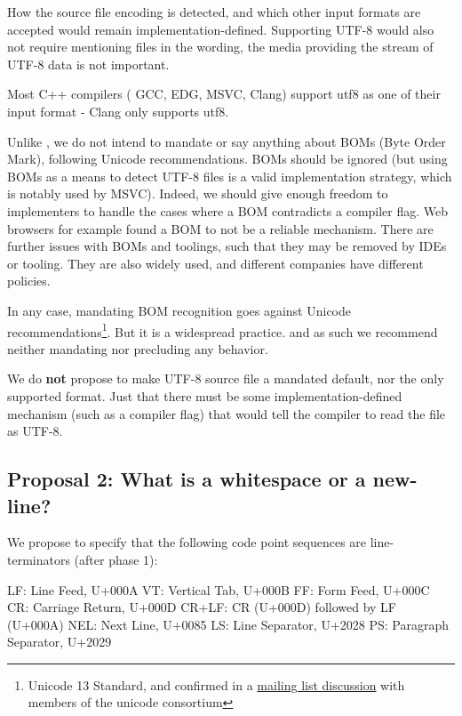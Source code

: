 \documentclass{wg21}
\begin{document}
How the source file encoding is detected, and which other input formats are accepted would remain implementation-defined.
Supporting UTF-8 would also not require mentioning files in the wording, the media providing the stream of UTF-8 data is not important.

Most C++ compilers ( GCC, EDG, MSVC, Clang) support utf8 as one of their input format - Clang only supports utf8.

Unlike , we do not intend to mandate or say anything about BOMs (Byte Order Mark), following Unicode recommendations.
BOMs should be ignored (but using BOMs as a means to detect UTF-8 files is a valid implementation strategy, which is notably used by MSVC).
Indeed, we should give enough freedom to implementers to handle the cases where a BOM contradicts a compiler flag.
Web browsers for example found a BOM to not be a reliable mechanism.
There are further issues with BOMs and toolings, such that they may be removed by IDEs or tooling.
They are also widely used, and different companies have different policies.

In any case, mandating BOM recognition goes against Unicode recommendations\footnote{Unicode 13 Standard, and confirmed in a \href{https://corp.unicode.org/mailman/private/unicode/2020-June/008716.html}{mailing list discussion} with members of the unicode consortium}. But it is a widespread practice. and as such
we recommend neither mandating nor precluding any behavior.

We do \textbf{not} propose to make UTF-8 source file a mandated default, nor the only supported format. Just that there must be
some implementation-defined mechanism (such as a compiler flag) that would tell the compiler to read the file as UTF-8.


\subsection{Proposal 2: What is a whitespace or a new-line?}

We propose to specify that the following code point sequences are line-terminators (after phase 1):

\begin{codeblock}
LF:    Line Feed, U+000A
VT:    Vertical Tab, U+000B
FF:    Form Feed, U+000C
CR:    Carriage Return, U+000D
CR+LF: CR (U+000D) followed by LF (U+000A)
NEL:   Next Line, U+0085
LS:    Line Separator, U+2028
PS:    Paragraph Separator, U+2029
\end{codeblock}
\end{document}
